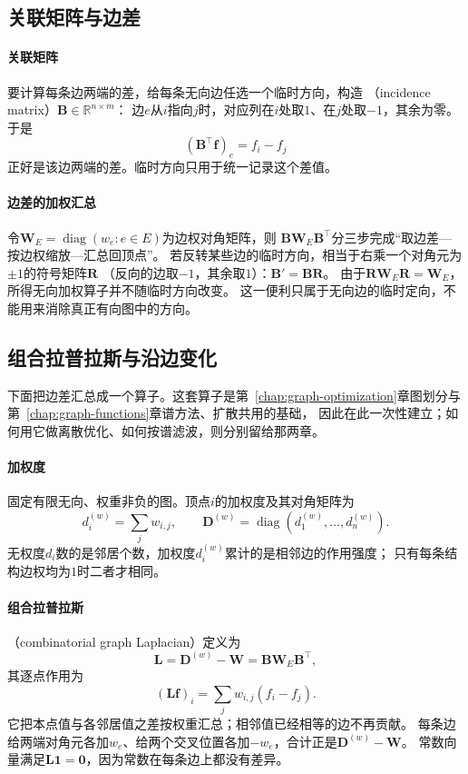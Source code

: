 \subsection{关联矩阵与边差}

\paragraph{关联矩阵}
要计算每条边两端的差，给每条无向边任选一个临时方向，构造
（incidence matrix）$\bm B\in\mathbb R^{n\times m}$：
边$e$从$i$指向$j$时，对应列在$i$处取$1$、在$j$处取$-1$，其余为零。
于是
\[
  (\bm B^\top\bm f)_e=f_i-f_j
\]
正好是该边两端的差。临时方向只用于统一记录这个差值。

\paragraph{边差的加权汇总}
令$\bm W_E=\operatorname{diag}(w_e:e\in E)$为边权对角矩阵，则
$\bm B\bm W_E\bm B^\top$分三步完成“取边差—按边权缩放—汇总回顶点”。
若反转某些边的临时方向，相当于右乘一个对角元为$\pm1$的符号矩阵$\bm R$
（反向的边取$-1$，其余取$1$）：$\bm B'=\bm B\bm R$。
由于$\bm R\bm W_E\bm R=\bm W_E$，所得无向加权算子并不随临时方向改变。
这一便利只属于无向边的临时定向，不能用来消除真正有向图中的方向。

\subsection{组合拉普拉斯与沿边变化}

下面把边差汇总成一个算子。这套算子是第~\ref{chap:graph-optimization}章图划分与第~\ref{chap:graph-functions}章谱方法、扩散共用的基础，
因此在此一次性建立；如何用它做离散优化、如何按谱滤波，则分别留给那两章。

\paragraph{加权度}
固定有限无向、权重非负的图。顶点$i$的加权度及其对角矩阵为
\[
  d_i^{(w)}=\sum_j w_{i,j},\qquad
  \bm D^{(w)}=\operatorname{diag}(d_1^{(w)},\ldots,d_n^{(w)}).
\]
无权度$d_i$数的是邻居个数，加权度$d_i^{(w)}$累计的是相邻边的作用强度；
只有每条结构边权均为$1$时二者才相同。

\paragraph{组合拉普拉斯}
（combinatorial graph Laplacian）定义为
\begin{equation}
  \bm L=\bm D^{(w)}-\bm W=\bm B\bm W_E\bm B^\top,
  \label{eq:graph-theory-combinatorial-laplacian}
\end{equation}
其逐点作用为
\[
  (\bm L\bm f)_i=\sum_j w_{i,j}(f_i-f_j).
\]
它把本点值与各邻居值之差按权重汇总；相邻值已经相等的边不再贡献。
每条边给两端对角元各加$w_e$、给两个交叉位置各加$-w_e$，合计正是$\bm D^{(w)}-\bm W$。
常数向量满足$\bm L\bm 1=\bm 0$，因为常数在每条边上都没有差异。

